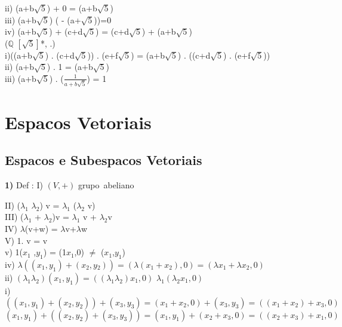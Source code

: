 \documentclass[a4paper,12pt]{report}
\begin{document}
ii) (a+b$\sqrt{5}$) + 0 = (a+b$\sqrt{5}$)\\

iii) (a+b$\sqrt{5}$) ( - (a+$\sqrt{5}$))=0 \\

iv) (a+b$\sqrt{5}$) + (c+d$\sqrt{5}$) = (c+d$\sqrt{5}$) + (a+b$\sqrt{5}$)\\



($\mathbb{Q}$ $[\sqrt{5}]$*, .) \\

i)((a+b$\sqrt{5}$) . (c+d$\sqrt{5}$)) . (e+f$\sqrt{5}$) = (a+b$\sqrt{5}$) . ((c+d$\sqrt{5}$) . (e+f$\sqrt{5}$))\\

ii) (a+b$\sqrt{5}$) . 1 = (a+b$\sqrt{5}$)\\

iii) (a+b$\sqrt{5}$) . ($\frac{1} {a+b\sqrt{5} }$) = 1


\chapter{Espacos Vetoriais }
\section{Espacos e Subespacos Vetoriais}
\textbf{1)} Def : 
I) $(V,+)$ grupo\   abeliano

II) ($\lambda_{1}$ $\lambda_{2}$) v = $\lambda_{1}$ ($\lambda_{2}$ v) \\

III) ($\lambda_{1}$ + $\lambda_{2}$)v = $\lambda_{1}$ v + $\lambda_{2}$v \\

IV) $\lambda$(v+w) = $\lambda$v+$\lambda$w \\

V) 1. v = v \\

v) 1($x_{1}$ ,$y_{1}$) = (1$x_{1}$,0) $\ne$ ($x_{1}$,$y_{1}$) \\

iv) $\lambda((x_{1},y_{1}) + (x_{2},y{_2})) = (\lambda(x_{1}+x_{2}),0) =  (\lambda x_{1} + \lambda x_{2},0)$ \\

ii) $(\lambda_{1} \lambda_{2})(x_{1},y_{1}) = ((\lambda_{1}\lambda_{2})x_{1},0)$ $\lambda_{1}(\lambda_{2} x_{1},0)$ \\

i) $((x_{1},y_{1}) + (x_{2},y_{2})) + (x_{3},y_{3}) = (x_{1}+x_{2},0) + (x_{3},y_{3}) = ((x_{1}+x_{2}) + x_{3},0)$\\ 
$(x_{1},y_{1})+ ((x_{2},y_{2}) + (x_{3},y_{3})) = (x_{1},y_{1}) + (x_{2}+x_{3},0) = ((x_{2}+x_{3}) + x_{1},0)$ \\
\end{document}

